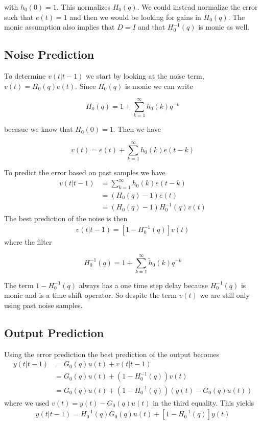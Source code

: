 with $h_0(0)=1$.
This normalizes $H_0(q)$.
We could instead normalize the error such that $e(t)=1$ and then we would be looking for gains in $H_0(q)$.
The monic assumption also implies that $D=I$ and that $H_0^{-1}(q)$ is monic as well.

\subsection{Noise Prediction}
To determine $v(t|t-1)$ we start by looking at the noise term, $v(t)=H_0(q)e(t)$.
Since $H_0(q)$ is monic we can write

\begin{equation*}
H_0(q) = 1 + \sum_{k=1}^\infty h_0(k)q^{-k}
\end{equation*}

becasue we know that $H_0(0) = 1$.
Then we have

\begin{equation*}
v(t) = e(t) + \sum_{k=1}^\infty h_0(k)e(t-k)
\end{equation*}

To predict the error based on past samples we have
\begin{align*}
v(t|t-1) &= \sum_{k=1}^\infty h_0(k)e(t-k) \\
&= (H_0(q)-1)e(t) \\
&= (H_0(q)-1)H_0^{-1}(q)v(t)
\end{align*}
The best prediction of the noise is then
\begin{align}
\label{eq:noise}
\boxed{v(t|t-1) = [1-H_0^{-1}(q)]v(t)}
\end{align}
where the filter

\begin{equation*}
H_0^{-1}(q) = 1+\sum_{k=1}^\infty \tilde{h}_0(k)q^{-k}
\end{equation*}

The term $1-H_0^{-1}(q)$ always has a one time step delay because $H_0^{-1}(q)$ is monic and is a time shift operator.
So despite the term $v(t)$ we are still only using past noise samples.

\subsection{Output Prediction}
Using the error prediction the best prediction of the output becomes
\begin{align*}
y(t|t-1) &= G_0(q)u(t)+v(t|t-1) \\
&= G_0(q)u(t) + (1-H_0^{-1}(q))v(t) \\
&= G_0(q)u(t) + (1-H_0^{-1}(q))(y(t)-G_0(q)u(t))
\end{align*}
where we used $v(t)=y(t)-G_0(q)u(t)$ in the third equality.
This yields
\begin{align}
\label{eq:output}
\boxed{y(t|t-1) = H_0^{-1}(q)G_0(q)u(t) + [1-H_0^{-1}(q)]y(t)}
\end{align}

